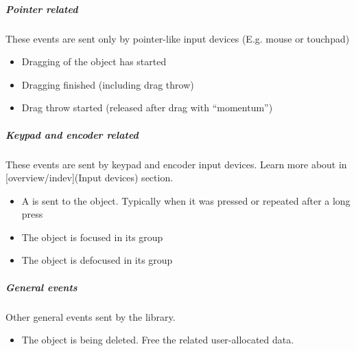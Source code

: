 \documentclass[letterpaper,10pt,english]{sphinxmanual}
\begin{document}
\subparagraph{Pointer related}
\label{\detokenize{overview/events:pointer-related}}
These events are sent only by pointer-like input devices (E.g. mouse or touchpad)
\begin{itemize}
\item {} 
 Dragging of the object has started

\item {} 
 Dragging finished (including drag throw)

\item {} 
 Drag throw started (released after drag with “momentum”)

\end{itemize}


\subparagraph{Keypad and encoder related}
\label{\detokenize{overview/events:keypad-and-encoder-related}}
These events are sent by keypad and encoder input devices. Learn more about  in {[}overview/indev{]}(Input devices) section.
\begin{itemize}
\item {} 
 A  is sent to the object. Typically when it was pressed or repeated after a long press

\item {} 
 The object is focused in its group

\item {} 
 The object is defocused in its group

\end{itemize}


\subparagraph{General events}
\label{\detokenize{overview/events:general-events}}
Other general events sent by the library.
\begin{itemize}
\item {} 
 The object is being deleted. Free the related user-allocated data.

\end{itemize}
\end{document}

